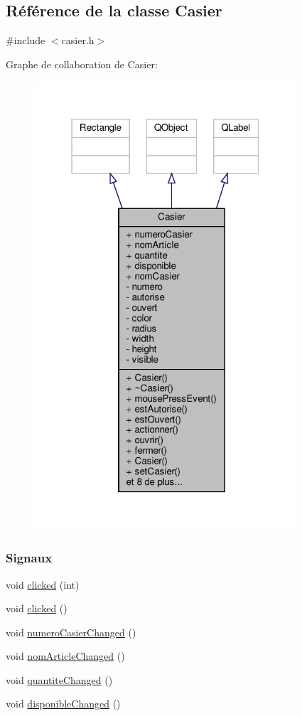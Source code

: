 \hypertarget{class_casier}{}\subsection{Référence de la classe Casier}
\label{class_casier}


{\ttfamily \#include $<$casier.\+h$>$}



Graphe de collaboration de Casier\+:\nopagebreak
\begin{figure}[H]
\begin{center}
\leavevmode
\includegraphics[width=277pt]{class_casier__coll__graph}
\end{center}
\end{figure}
\subsubsection*{Signaux}
\begin{DoxyCompactItemize}
\item 
void \hyperlink{class_casier_a5928c3717df16d812410b804f2b0a9a0}{clicked} (int)
\item 
void \hyperlink{class_casier_a6f147d5151d266424cc84b114ccf073b}{clicked} ()
\item 
void \hyperlink{class_casier_a1680f30d5ac866684ff0eb72a1415e3a}{numero\+Casier\+Changed} ()
\item 
void \hyperlink{class_casier_a736c4258ae979ad948ee3899545c317b}{nom\+Article\+Changed} ()
\item 
void \hyperlink{class_casier_af38fa35a703495e3708528f60459efa4}{quantite\+Changed} ()
\item 
void \hyperlink{class_casier_afb79177c7c523f90c9a384522babf9e6}{disponible\+Changed} ()
\end{DoxyCompactItemize}
